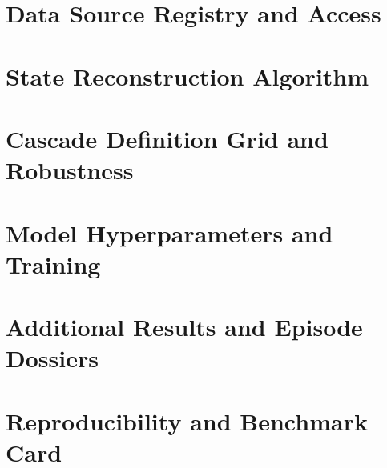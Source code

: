 \section{Data Source Registry and Access}\label{app:sources}

\section{State Reconstruction Algorithm}\label{app:state}

\section{Cascade Definition Grid and Robustness}\label{app:defgrid}

\section{Model Hyperparameters and Training}\label{app:models}

\section{Additional Results and Episode Dossiers}\label{app:results}

\section{Reproducibility and Benchmark Card}\label{app:repro}
